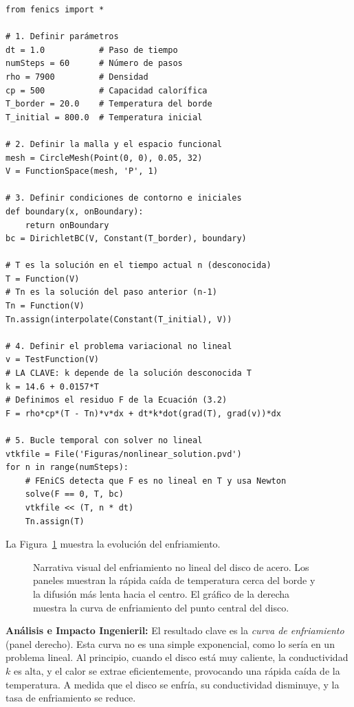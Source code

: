 \begin{codelisting}[h!]
\begin{verbatim}
from fenics import *

# 1. Definir parámetros
dt = 1.0           # Paso de tiempo
numSteps = 60      # Número de pasos
rho = 7900         # Densidad
cp = 500           # Capacidad calorífica
T_border = 20.0    # Temperatura del borde
T_initial = 800.0  # Temperatura inicial

# 2. Definir la malla y el espacio funcional
mesh = CircleMesh(Point(0, 0), 0.05, 32)
V = FunctionSpace(mesh, 'P', 1)

# 3. Definir condiciones de contorno e iniciales
def boundary(x, onBoundary):
    return onBoundary
bc = DirichletBC(V, Constant(T_border), boundary)

# T es la solución en el tiempo actual n (desconocida)
T = Function(V) 
# Tn es la solución del paso anterior (n-1)
Tn = Function(V)
Tn.assign(interpolate(Constant(T_initial), V))

# 4. Definir el problema variacional no lineal
v = TestFunction(V)
# LA CLAVE: k depende de la solución desconocida T
k = 14.6 + 0.0157*T 
# Definimos el residuo F de la Ecuación (3.2)
F = rho*cp*(T - Tn)*v*dx + dt*k*dot(grad(T), grad(v))*dx

# 5. Bucle temporal con solver no lineal
vtkfile = File('Figuras/nonlinear_solution.pvd')
for n in range(numSteps):
    # FEniCS detecta que F es no lineal en T y usa Newton
    solve(F == 0, T, bc)
    vtkfile << (T, n * dt)
    Tn.assign(T)
\end{verbatim}
\caption{Script de FEniCS para resolver la Ecuación del Calor no lineal.}
\label{lst:nonlinear-code}
\end{codelisting}

La Figura~\ref{fig:nonlinear-result} muestra la evolución del enfriamiento.

\begin{figure}[h!]
    \centering
    \caption{Narrativa visual del enfriamiento no lineal del disco de acero. Los paneles muestran la rápida caída de temperatura cerca del borde y la difusión más lenta hacia el centro. El gráfico de la derecha muestra la curva de enfriamiento del punto central del disco.}
    \label{fig:nonlinear-result}
\end{figure}

\textbf{Análisis e Impacto Ingenieril:} El resultado clave es la \textit{curva de enfriamiento} (panel derecho). Esta curva no es una simple exponencial, como lo sería en un problema lineal. Al principio, cuando el disco está muy caliente, la conductividad \(k\) es alta, y el calor se extrae eficientemente, provocando una rápida caída de la temperatura. A medida que el disco se enfría, su conductividad disminuye, y la tasa de enfriamiento se reduce.

